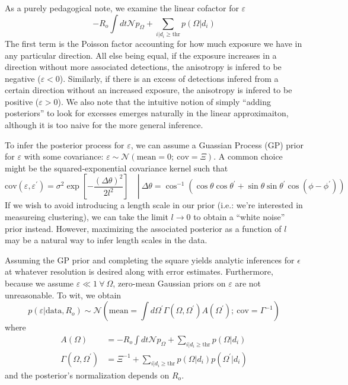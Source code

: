 \documentclass{article}
\begin{document}
As a purely pedagogical note, we examine the linear cofactor for $\varepsilon$
\begin{equation}\label{eq:linear cofactor}
    -R_o \int dt \mathcal{N} p_\Omega + \sum\limits_{i|d_i\geq\mathrm{thr}} p(\Omega|d_i)
\end{equation}
The first term is the Poisson factor accounting for how much exposure we have in any particular direction. 
All else being equal, if the exposure increases in a direction without more associated detections, the anisotropy is infered to be negative ($\varepsilon < 0$). 
Similarly, if there is an excess of detections infered from a certain direction without an increased exposure, the anisotropy is infered to be positive ($\varepsilon > 0$).
We also note that the intuitive notion of simply ``adding posteriors'' to look for excesses emerges naturally in the linear approximaiton, although it is too naive for the more general inference.

To infer the posterior process for $\varepsilon$, we can assume a Guassian Process (GP) prior for $\varepsilon$ with some covariance: $\varepsilon \sim \mathcal{N}\left(\mathrm{mean}=0;\ \mathrm{cov}=\Xi\right)$.
A common choice might be the squared-exponential covariance kernel such that
\begin{equation}
    \left. \text{cov}(\varepsilon, \varepsilon^\prime) = \sigma^2 \exp \left[ -\frac{\left(\Delta \theta\right)^2}{2l^2}\right] \quad  \right| \ \Delta \theta = \cos^{-1}\left(\cos\theta\cos\theta^\prime + \sin\theta\sin\theta^\prime\cos(\phi-\phi^\prime)\right)
\end{equation}
If we wish to avoid introducing a length scale in our prior (i.e.: we're interested in measureing clustering), we can take the limit $l \rightarrow 0$ to obtain a ``white noise'' prior instead.
However, maximizing the associated posterior as a function of $l$ may be a natural way to infer length scales in the data.

Assuming the GP prior and completing the square yields analytic inferences for $\epsilon$ at whatever resolution is desired along with error estimates.
Furthermore, because we assume $\varepsilon \ll 1 \ \forall \ \Omega$, zero-mean Gaussian priors on $\varepsilon$ are not unreasonable.
To wit, we obtain
\begin{equation}
    p(\varepsilon|\mathrm{data}, R_o) \sim \mathcal{N}\left( \mathrm{mean}=\int d\Omega^\prime \Gamma(\Omega, \Omega^\prime) A(\Omega^\prime);\ \mathrm{cov}=\Gamma^{-1}\right)
\end{equation}
where
\begin{align}
    A(\Omega) & = -R_o\int dt\mathcal{N}p_\Omega + \sum\limits_{i|d_i\geq\mathrm{thr}} p(\Omega|d_i) \\
    \Gamma(\Omega, \Omega^\prime) & = \Xi^{-1} + \sum\limits_{i|d_i\geq\mathrm{thr}} p(\Omega|d_i)p(\Omega^\prime|d_i)
\end{align}
and the posterior's normalization depends on $R_o$.
\end{document}
